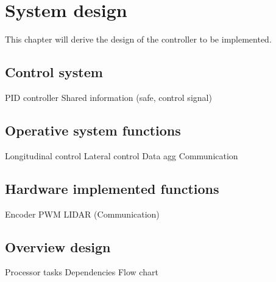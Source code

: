\chapter{System design}
\label{sec:system_design}
This chapter will derive the design of the controller to be implemented.

\section{Control system}
PID controller
Shared information (safe, control signal)

\section{Operative system functions}
Longitudinal control
Lateral control
Data agg
Communication

\section{Hardware implemented functions}
Encoder
PWM
LIDAR
(Communication)

\section{Overview design}
Processor tasks
Dependencies
Flow chart